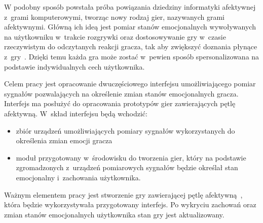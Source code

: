 W podobny sposób powstała próba powiązania dziedziny informatyki afektywnej z~grami komputerowymi, tworząc nowy rodzaj gier, nazywanych grami afektywnymi. Główną ich ideą jest pomiar stanów emocjonalnych wywoływanych na użytkowniku w~trakcie rozgrywki oraz dostosowywanie gry w~czasie rzeczywistym do odczytanych reakcji gracza, tak aby zwiększyć doznania płynące z~gry~\cite{kotsia_affective_gaming}. Dzięki temu każda gra może zostać w~pewien sposób spersonalizowana na podstawie indywidualnych cech użytkownika. 

Celem pracy jest opracowanie dwuczęściowego interfejsu umożliwiającego pomiar sygnałów pozwalających na określenie zmian stanów emocjonalnych gracza. Interfejs ma posłużyć do opracowania prototypów gier zawierających pętlę afektywną. W~skład interfejsu będą wchodzić:
\begin{itemize}
	\item zbiór urządzeń umożliwiających pomiary sygnałów wykorzystanych do określenia zmian emocji gracza
	\item moduł przygotowany w~środowisku do tworzenia gier, który na podstawie zgromadzonych z~urządzeń pomiarowych sygnałów będzie określał stan emocjonalny i~zachowania użytkownika.
\end{itemize}
Ważnym elementem pracy jest stworzenie gry zawierającej pętlę afektywną~\cite{affective_loop_experiences}, która będzie wykorzystywała przygotowany interfejs. Po wykryciu zachowań oraz zmian stanów emocjonalnych użytkownika stan gry jest aktualizowany.

